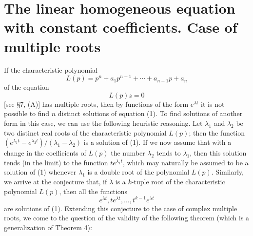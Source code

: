 \documentclass[10pt,a5paper]{book}
\theoremstyle{plain}
\theoremstyle{definition}
\theoremstyle{remark}
\begin{document}
\section{The linear homogeneous equation with constant coefficients. Case of multiple roots}
If the characteristic polynomial
\[
L(p)=p^{n}+a_{1} p^{n-1}+\cdots+a_{n-1} p+a_{n}
\]
of the equation
\begin{equation*}
L(p) z=0 \tag{1}
\end{equation*}
[see §7, (A)] has multiple roots, then by functions of the form $e^{\lambda t}$ it is not possible to find $n$ distinct solutions of equation (1). To find solutions of another form in this case, we can use the following heuristic reasoning. Let $\lambda_{1}$ and $\lambda_{2}$ be two distinct real roots of the characteristic polynomial $L(p)$; then the function $\left(e^{\lambda_{1} t}-e^{\lambda_{2} t}\right) /\left(\lambda_{1}-\lambda_{2}\right)$ is a solution of (1). If we now assume that with a change in the coefficients of $L(p)$ the number $\lambda_{2}$ tends to $\lambda_{1}$, then this solution tends (in the limit) to the function $t e^{\lambda_{1} t}$, which may naturally be assumed to be a solution of (1) whenever $\lambda_{1}$ is a double root of the polynomial $L(p)$. Similarly, we arrive at the conjecture that, if $\lambda$ is a $k$-tuple root of the characteristic polynomial $L(p)$, then all the functions
\[
e^{\lambda t}, t e^{\lambda t}, \ldots, t^{k-1} e^{\lambda t}
\]
are solutions of (1). Extending this conjecture to the case of complex multiple roots, we come to the question of the validity of the following theorem (which is a generalization of Theorem 4):
\end{document}
